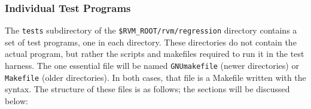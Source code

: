 \subsubsection{Individual Test Programs}

 The {\tt tests} subdirectory of the {\tt{\$RVM\_ROOT/rvm/regression}}
directory contains a set of test programs, one in each directory.
These directories do not contain the actual program, but rather the
scripts and makefiles required to run it in the test harness.  The one
essential file will be named \texttt{GNUmakefile} (newer directories)
or \texttt{Makefile} (older directories).  In both cases, that file is
a Makefile written with the  syntax.  The structure of these
files is as follows; the sections will be discussed below:  
\begin{enumerate}
\end{enumerate}

